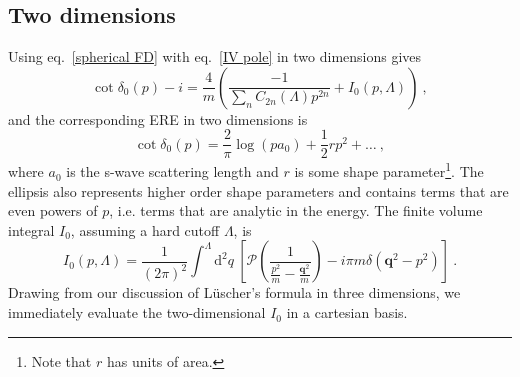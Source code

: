 \subsection{Two dimensions}

Using eq.~\eqref{spherical FD} with eq.~\eqref{IV pole} in two dimensions gives
\begin{equation}\label{eq:Q1}
\cot \delta_{0}(p)-i=\frac{4}{m} \left(\frac{-1}{\sum_nC_{2n}(\Lambda)p^{2n}}+I_{0}(p, \Lambda)\right)\ ,
\end{equation}
and the corresponding ERE in two dimensions is
\begin{equation}\label{eq:Q2}
\cot\delta_0(p)=\frac{2}{\pi}\log(p a_0)+\frac{1}{2} r p^2 + \ldots\ ,
\end{equation}
where $a_0$ is the s-wave scattering length and $r$ is some shape parameter\footnote{Note that $r$ has units of area.}.  The ellipsis also represents higher order shape parameters and contains terms that are even powers of $p$, i.e.  terms that are analytic in the energy.   The finite volume integral $I_0$, assuming a hard cutoff $\Lambda$, is
\begin{equation}\label{eq:I0 2d}
I_0(p,\Lambda)=\frac{1}{(2 \pi)^{2}} \int^{\Lambda} \mathrm{d}^2q\ \left[\mathcal{P}\left(\frac{1}{\frac{p^2}{m}-\frac{\bm{q}^{2}}{m}}\right)-i \pi m\delta(\bm q^2-p^2)\right]\ .
\end{equation}
Drawing from our discussion of L\"uscher's formula in three dimensions, we immediately evaluate the two-dimensional $I_0$ in a cartesian basis.  
